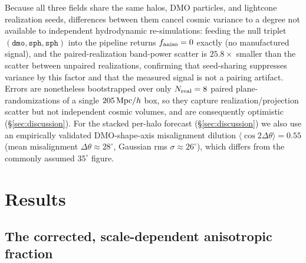\documentclass[11pt]{article}
\newcommand{\faniso}{f_{\rm aniso}}
\begin{document}
Because all three fields share the same halos, DMO particles, and
lightcone realization seeds, differences between them cancel cosmic
variance to a degree not available to independent hydrodynamic
re-simulations: feeding the null triplet $(\texttt{dmo},\texttt{sph},
\texttt{sph})$ into the pipeline returns $\faniso=0$ exactly (no
manufactured signal), and the paired-realization band-power scatter is
$25.8\times$ smaller than the scatter between unpaired realizations,
confirming that seed-sharing suppresses variance by this factor and that
the measured signal is not a pairing artifact.\ %
Errors are nonetheless bootstrapped over only $N_{\rm real}=8$ paired
plane-randomizations of a single $205\,{\rm Mpc}/h$ box, so they capture
realization/projection scatter but not independent cosmic volumes, and
are consequently optimistic (\S\ref{sec:discussion}). For the stacked
per-halo forecast (\S\ref{sec:discussion}) we also use an empirically
validated DMO-shape-axis misalignment dilution
$\langle\cos2\Delta\theta\rangle=0.55$ (mean misalignment
$\Delta\theta\approx28^{\circ}$, Gaussian rms $\sigma\approx26^{\circ}$),
which differs from the commonly assumed $35^{\circ}$ figure.\ %

\section{Results}\label{sec:results}

\subsection{The corrected, scale-dependent anisotropic fraction}\label{sec:headline}
\end{document}
